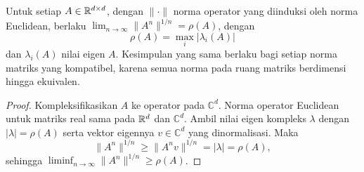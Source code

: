 \begin{lemma}\label{acceleration:lemma:spectral_radius}
    Untuk setiap \(A\in\mathbb{R}^{d\times d}\), dengan \(\|\cdot\|\) norma operator yang diinduksi oleh norma Euclidean, berlaku \(\lim_{n\rightarrow\infty}\|A^n\|^{1/n}=\rho(A)\), dengan
    \begin{equation}
        \rho(A)=\max_i|\lambda_i(A)|
    \end{equation}
    dan \(\lambda_i(A)\) nilai eigen \(A\). Kesimpulan yang sama berlaku bagi setiap norma matriks yang kompatibel, karena semua norma pada ruang matriks berdimensi hingga ekuivalen.
\end{lemma}
\begin{proof}
    Kompleksifikasikan \(A\) ke operator pada \(\mathbb{C}^d\). Norma operator Euclidean untuk matriks real sama pada \(\mathbb{R}^d\) dan \(\mathbb{C}^d\). Ambil nilai eigen kompleks \(\lambda\) dengan \(|\lambda|=\rho(A)\) serta vektor eigennya \(v\in\mathbb{C}^d\) yang dinormalisasi. Maka
    \begin{equation}
        \|A^n\|^{1/n}\geq\|A^nv\|^{1/n}=|\lambda|=\rho(A),
    \end{equation}
    sehingga \(\liminf_{n\rightarrow\infty}\|A^n\|^{1/n}\geq\rho(A)\).


\end{proof}
